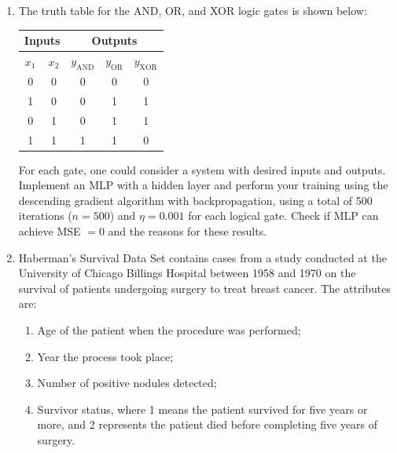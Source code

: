 \begin{enumerate}
\item The truth table for the AND, OR, and XOR logic gates is shown below:

\begin{center}
\begin{tabular}{cc|ccc}
\hline
\multicolumn{2}{c|}{Inputs} & \multicolumn{3}{c}{Outputs}                                  \\ \hline
$x_1$         & $x_2$        & $y_{\textrm{AND}}$ & $y_{\textrm{OR}}$ & $y_{\textrm{XOR}}$ \\ \hline
0             & 0            & 0                  & 0                 & 0                  \\
1             & 0            & 0                  & 1                 & 1                  \\
0             & 1            & 0                  & 1                 & 1                  \\
1             & 1            & 1                  & 1                 & 0                 \\ \hline
\end{tabular}
\end{center}


For each gate, one could consider a system with desired inputs and outputs. Implement an MLP with a hidden layer and perform your training using the descending gradient algorithm with backpropagation, using a total of 500 iterations ($n = 500$) and $\eta = 0.001$ for each logical gate. Check if MLP can achieve MSE $ = 0$ and the reasons for these results.

\item  Haberman's Survival Data Set contains cases from a study conducted at the University of Chicago Billings Hospital between 1958 and 1970 on the survival of patients undergoing surgery to treat breast cancer. The attributes are:
\begin{enumerate}
    \item Age of the patient when the procedure was performed;
	\item Year the process took place;
	\item Number of positive nodules detected;
	\item Survivor status, where 1 means the patient survived for five years or more, and 2 represents the patient died before completing five years of surgery.
\end{enumerate}


\end{enumerate}

